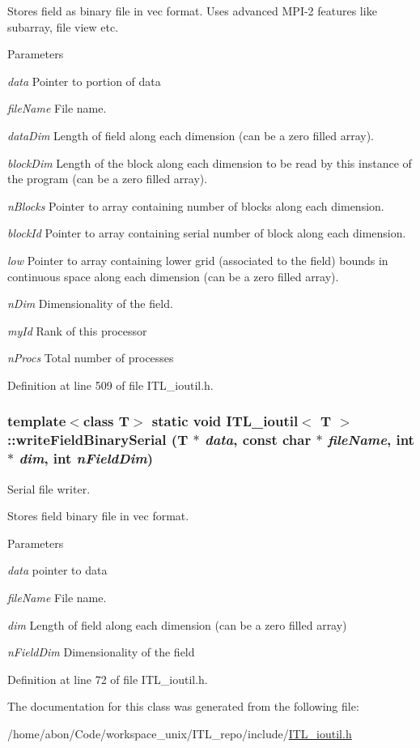 Stores field as binary file in vec format. Uses advanced MPI-\/2 features like subarray, file view etc. 
\begin{DoxyParams}{Parameters}
\item[{\em data}]Pointer to portion of data \item[{\em fileName}]File name. \item[{\em dataDim}]Length of field along each dimension (can be a zero filled array). \item[{\em blockDim}]Length of the block along each dimension to be read by this instance of the program (can be a zero filled array). \item[{\em nBlocks}]Pointer to array containing number of blocks along each dimension. \item[{\em blockId}]Pointer to array containing serial number of block along each dimension. \item[{\em low}]Pointer to array containing lower grid (associated to the field) bounds in continuous space along each dimension (can be a zero filled array). \item[{\em nDim}]Dimensionality of the field. \item[{\em myId}]Rank of this processor \item[{\em nProcs}]Total number of processes \end{DoxyParams}


Definition at line 509 of file ITL\_\-ioutil.h.

\hypertarget{classITL__ioutil_aa5b0c964006ea184dbc7303bdf4a3424}{
\subsubsection[{writeFieldBinarySerial}]{\setlength{\rightskip}{0pt plus 5cm}template$<$class T$>$ static void {\bf ITL\_\-ioutil}$<$ T $>$::writeFieldBinarySerial (T $\ast$ {\em data}, \/  const char $\ast$ {\em fileName}, \/  int $\ast$ {\em dim}, \/  int {\em nFieldDim})}}
\label{classITL__ioutil_aa5b0c964006ea184dbc7303bdf4a3424}


Serial file writer. 

Stores field binary file in vec format. 
\begin{DoxyParams}{Parameters}
\item[{\em data}]pointer to data \item[{\em fileName}]File name. \item[{\em dim}]Length of field along each dimension (can be a zero filled array) \item[{\em nFieldDim}]Dimensionality of the field \end{DoxyParams}


Definition at line 72 of file ITL\_\-ioutil.h.



The documentation for this class was generated from the following file:\begin{DoxyCompactItemize}
\item 
/home/abon/Code/workspace\_\-unix/ITL\_\-repo/include/\hyperlink{ITL__ioutil_8h}{ITL\_\-ioutil.h}\end{DoxyCompactItemize}
